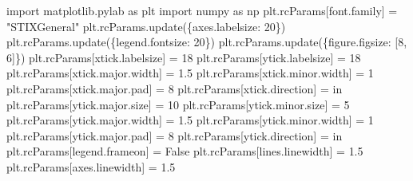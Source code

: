 \documentclass[
  letterpaper,
  DIV=11,
  numbers=noendperiod]{scrreprt}
\newenvironment{Shaded}{\begin{snugshade}}{\end{snugshade}}
\newcommand{\DecValTok}[1]{\textcolor[rgb]{0.68,0.00,0.00}{#1}}
\newcommand{\FloatTok}[1]{\textcolor[rgb]{0.68,0.00,0.00}{#1}}
\newcommand{\ImportTok}[1]{\textcolor[rgb]{0.00,0.46,0.62}{#1}}
\newcommand{\NormalTok}[1]{\textcolor[rgb]{0.00,0.23,0.31}{#1}}
\newcommand{\OperatorTok}[1]{\textcolor[rgb]{0.37,0.37,0.37}{#1}}
\newcommand{\StringTok}[1]{\textcolor[rgb]{0.13,0.47,0.30}{#1}}
\newcommand{\VariableTok}[1]{\textcolor[rgb]{0.07,0.07,0.07}{#1}}
\begin{document}
\begin{tcolorbox}[enhanced jigsaw, toprule=.15mm, colframe=quarto-callout-color-frame, bottomrule=.15mm, leftrule=.75mm, left=2mm, breakable, rightrule=.15mm, arc=.35mm, opacityback=0, colback=white]
\begin{Shaded}
\begin{Highlighting}[]
\ImportTok{import}\NormalTok{ matplotlib.pylab }\ImportTok{as}\NormalTok{ plt}
\ImportTok{import}\NormalTok{ numpy }\ImportTok{as}\NormalTok{ np}
\NormalTok{plt.rcParams[}\StringTok{\textquotesingle{}font.family\textquotesingle{}}\NormalTok{] }\OperatorTok{=} \StringTok{"STIXGeneral"}
\NormalTok{plt.rcParams.update(\{}\StringTok{\textquotesingle{}axes.labelsize\textquotesingle{}}\NormalTok{: }\DecValTok{20}\NormalTok{\})}
\NormalTok{plt.rcParams.update(\{}\StringTok{\textquotesingle{}legend.fontsize\textquotesingle{}}\NormalTok{: }\DecValTok{20}\NormalTok{\})}
\NormalTok{plt.rcParams.update(\{}\StringTok{\textquotesingle{}figure.figsize\textquotesingle{}}\NormalTok{: [}\DecValTok{8}\NormalTok{, }\DecValTok{6}\NormalTok{]\})}
\NormalTok{plt.rcParams[}\StringTok{\textquotesingle{}xtick.labelsize\textquotesingle{}}\NormalTok{] }\OperatorTok{=} \DecValTok{18}
\NormalTok{plt.rcParams[}\StringTok{\textquotesingle{}ytick.labelsize\textquotesingle{}}\NormalTok{] }\OperatorTok{=} \DecValTok{18}
\NormalTok{plt.rcParams[}\StringTok{\textquotesingle{}xtick.major.width\textquotesingle{}}\NormalTok{] }\OperatorTok{=} \FloatTok{1.5}
\NormalTok{plt.rcParams[}\StringTok{\textquotesingle{}xtick.minor.width\textquotesingle{}}\NormalTok{] }\OperatorTok{=} \DecValTok{1}
\NormalTok{plt.rcParams[}\StringTok{\textquotesingle{}xtick.major.pad\textquotesingle{}}\NormalTok{] }\OperatorTok{=} \DecValTok{8}
\NormalTok{plt.rcParams[}\StringTok{\textquotesingle{}xtick.direction\textquotesingle{}}\NormalTok{] }\OperatorTok{=} \StringTok{\textquotesingle{}in\textquotesingle{}}
\NormalTok{plt.rcParams[}\StringTok{\textquotesingle{}ytick.major.size\textquotesingle{}}\NormalTok{] }\OperatorTok{=} \DecValTok{10}
\NormalTok{plt.rcParams[}\StringTok{\textquotesingle{}ytick.minor.size\textquotesingle{}}\NormalTok{] }\OperatorTok{=} \DecValTok{5}
\NormalTok{plt.rcParams[}\StringTok{\textquotesingle{}ytick.major.width\textquotesingle{}}\NormalTok{] }\OperatorTok{=} \FloatTok{1.5}
\NormalTok{plt.rcParams[}\StringTok{\textquotesingle{}ytick.minor.width\textquotesingle{}}\NormalTok{] }\OperatorTok{=} \DecValTok{1}
\NormalTok{plt.rcParams[}\StringTok{\textquotesingle{}ytick.major.pad\textquotesingle{}}\NormalTok{] }\OperatorTok{=} \DecValTok{8}
\NormalTok{plt.rcParams[}\StringTok{\textquotesingle{}ytick.direction\textquotesingle{}}\NormalTok{] }\OperatorTok{=} \StringTok{\textquotesingle{}in\textquotesingle{}}
\NormalTok{plt.rcParams[}\StringTok{\textquotesingle{}legend.frameon\textquotesingle{}}\NormalTok{] }\OperatorTok{=} \VariableTok{False}
\NormalTok{plt.rcParams[}\StringTok{\textquotesingle{}lines.linewidth\textquotesingle{}}\NormalTok{] }\OperatorTok{=} \FloatTok{1.5}
\NormalTok{plt.rcParams[}\StringTok{\textquotesingle{}axes.linewidth\textquotesingle{}}\NormalTok{] }\OperatorTok{=} \FloatTok{1.5}


\end{Highlighting}
\end{Shaded}
\end{tcolorbox}
\end{document}
